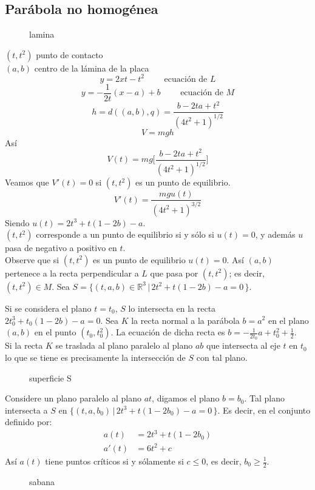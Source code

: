 \subsection{Parábola no homogénea}
\begin{figure}[ht]
    \centering
    \caption{lamina}
    \label{fig:lamina}
\end{figure}
$(t,t^2)$ punto de contacto \\
$(a,b)$ centro de la lámina de la placa \\
\[
  y = 2xt - t ^2 \qquad \mbox{ ecuación de }L
\]
\[
  y = - \frac{1}{2t} (x -a) + b \qquad  \mbox{ ecuación de }M
\]
\[
  h = d((a,b),q) = \frac{b - 2ta + t^2}{(4t^2 +1)^{1 / 2}}
\]
\[
  V = mgh
\]
Así 
\[
  V(t) = mg \big[ \frac{b-2ta + t^2}{(4t^2 +1)^{1 / 2}} \big]
\]
Veamos que $V'(t) = 0$ si $(t,t^2)$ es un punto de equilibrio.
\[
  V'(t) = \frac{ mg u(t)}{(4t^2 + 1)^{3 / 2}}
\]
Siendo $u(t) = 2t^3 + t(1- 2b) - a$. \\
$(t,t^2)$ corresponde a un punto de equilibrio si y sólo si $u(t) = 0$, y además
$u$ pasa de negativo a positivo en $t$. \\
Observe que si $(t, t^2)$ es un punto de equilibrio $u(t) = 0$. Así $(a,b)$
pertenece a la recta perpendicular a $L$ que pasa por $(t, t^2)$; es decir,
$(t,t^2) \in M$.
Sea $S = \{ (t,a,b) \in \mathbb{R}^3 \, | \, 2 t^2 + t(1-2b) - a = 0 \, \}$.

Si se considera el plano $t=t_0$, $S$ lo intersecta en la recta $2 t_0^3 +
t_0(1-2b) -a = 0$. 
Sea $K$ la recta normal a la parábola $b = a^2$ en el plano $(a,b)$ en el punto
$(t_0,t_0^2)$. La ecuación de dicha recta es $b =  - \frac{1}{2t_0} a + t_0^2 +
\frac{1}{2}$. \\
Si la recta $K$ se traslada al plano paralelo al plano $ab$ que intersecta al
eje $t$ en $t_0$ lo que se tiene es precisamente la intersección de $S$ con tal
plano.
\begin{figure}[ht]
    \centering
    \caption{superficie S}
    \label{fig:superficie-s}
\end{figure}
Considere un plano paralelo al plano $at$, digamos el plano $b = b_0$. Tal plano
intersecta a $S$ en $\{ (t, a, b_0) \, | \, 2t^3 + t(1-2b_0) -a = 0 \,\}$. Es
decir, en el conjunto definido por:
\begin{align*}
  a(t) &= 2t^3 + t(1-2b_0) \\
  a'(t) &= 6t^2 + c
\end{align*}
Así $a(t)$ tiene puntos críticos si y sólamente si $c \leq 0$, es decir, $b_0
\geq  \frac{1}{2}$. \\
\begin{figure}[ht]
    \centering
    \caption{sabana}
    \label{fig:sabana}
\end{figure}

